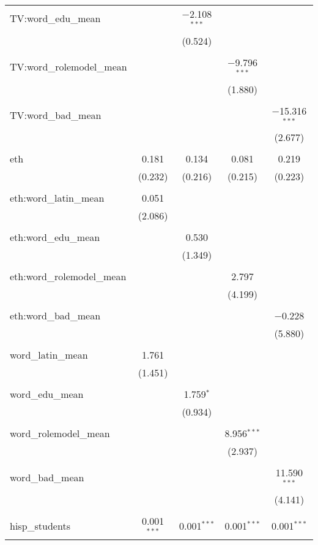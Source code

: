 \begin{table}[!htbp]
\begin{tabular}{@{\extracolsep{-2pt}}lcccc}
 TV:word\_edu\_mean &  & $-$2.108$^{***}$ &  &  \\ 
  &  & (0.524) &  &  \\ 
  & & & & \\ 
 TV:word\_rolemodel\_mean &  &  & $-$9.796$^{***}$ &  \\ 
  &  &  & (1.880) &  \\ 
  & & & & \\ 
 TV:word\_bad\_mean &  &  &  & $-$15.316$^{***}$ \\ 
  &  &  &  & (2.677) \\ 
  & & & & \\ 
 eth & 0.181 & 0.134 & 0.081 & 0.219 \\ 
  & (0.232) & (0.216) & (0.215) & (0.223) \\ 
  & & & & \\ 
 eth:word\_latin\_mean & 0.051 &  &  &  \\ 
  & (2.086) &  &  &  \\ 
  & & & & \\ 
 eth:word\_edu\_mean &  & 0.530 &  &  \\ 
  &  & (1.349) &  &  \\ 
  & & & & \\ 
 eth:word\_rolemodel\_mean &  &  & 2.797 &  \\ 
  &  &  & (4.199) &  \\ 
  & & & & \\ 
 eth:word\_bad\_mean &  &  &  & $-$0.228 \\ 
  &  &  &  & (5.880) \\ 
  & & & & \\ 
 word\_latin\_mean & 1.761 &  &  &  \\ 
  & (1.451) &  &  &  \\ 
  & & & & \\ 
 word\_edu\_mean &  & 1.759$^{*}$ &  &  \\ 
  &  & (0.934) &  &  \\ 
  & & & & \\ 
 word\_rolemodel\_mean &  &  & 8.956$^{***}$ &  \\ 
  &  &  & (2.937) &  \\ 
  & & & & \\ 
 word\_bad\_mean &  &  &  & 11.590$^{***}$ \\ 
  &  &  &  & (4.141) \\ 
  & & & & \\ 
 hisp\_students & 0.001$^{***}$ & 0.001$^{***}$ & 0.001$^{***}$ & 0.001$^{***}$ \\ 

\end{tabular}
\end{table}
